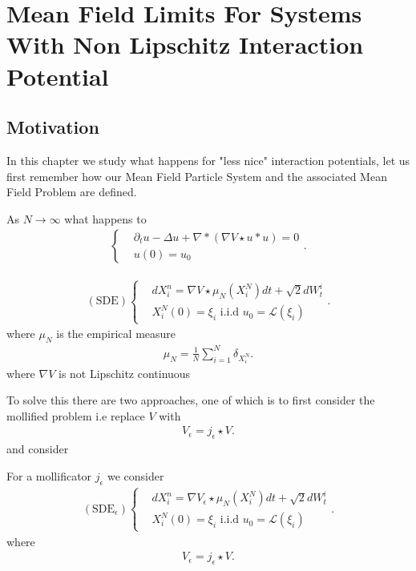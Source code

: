 \chapter{Mean Field Limits For Systems With Non Lipschitz Interaction Potential}
\section{Motivation}
In this chapter we study what happens for "less nice" interaction potentials, let us first 
remember how our Mean Field Particle System and the associated Mean Field Problem are defined.
\begin{Definition}
 As $N\to \infty$  what happens to 
 \begin{align*}
\begin{cases}
  &\partial_t u - \Delta u + \nabla * (\nabla V \star  u * u) = 0\\
  &u(0) = u_{0}
\end{cases}
 .\end{align*}
\end{Definition}
\begin{Definition}
\begin{align*}
  (\text{SDE})\begin{cases}
    &dX_i^n = \nabla V \star  \mu_N(X_i^{N} ) dt + \sqrt{2}dW_t^i\\
    &X_i^N(0) = \xi_i \text{ i.i.d } u_{0}=\mathcal{L}(\xi_i)
  \end{cases}
.\end{align*}  
where $\mu_N$ is the empirical measure
\begin{align*}
  \mu_N = \frac{1}{N} \sum_{i=1}^{N} \delta_{X_i^N}
.\end{align*}
where $\nabla V$ is not Lipschitz continuous
\end{Definition}
To solve this there are two approaches, one of which is to first consider the mollified problem i.e 
replace $V$ with
\begin{align*}
  V_\epsilon = j_{\epsilon}\star V
.\end{align*}
and consider 
\begin{Definition}
  For a mollificator $j_\epsilon$ we consider 
  \begin{align*}
  (\text{SDE}_\epsilon)\begin{cases}
    &dX_i^n = \nabla V_\epsilon \star  \mu_N(X_i^{N} ) dt + \sqrt{2}dW_t^i\\
    &X_i^N(0) = \xi_i \text{ i.i.d } u_{0}=\mathcal{L}(\xi_i)
  \end{cases}
.\end{align*}  
where 
\begin{align*}
  V_\epsilon = j_{\epsilon}\star V
.\end{align*}
\end{Definition}
